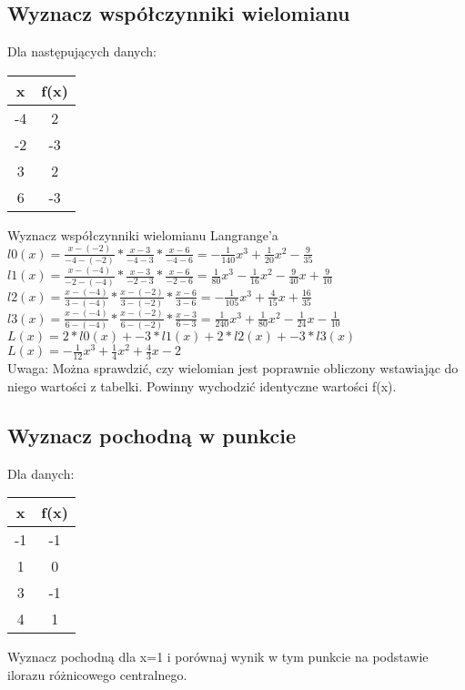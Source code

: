 \documentclass{article}
\begin{document}
\subsection{Wyznacz współczynniki wielomianu}
Dla następujących danych:
\begin{table}[H]
\begin{tabular}{|c|c|}
\hline
x  & f(x) \\ \hline
-4 & 2    \\ \hline
-2 & -3   \\ \hline
3  & 2    \\ \hline
6  & -3   \\ \hline
\end{tabular}
\end{table}
Wyznacz współczynniki wielomianu Langrange'a\\
$l0(x)=\frac{x- (-2)}{-4- (-2)}*\frac{x-3}{-4-3}*\frac{x-6}{-4-6} = -\frac{1}{140}x^3+\frac{1}{20}x^2-\frac{9}{35}$\\ %
$l1(x)=\frac{x- (-4)}{-2- (-4)}*\frac{x-3}{-2-3}*\frac{x-6}{-2-6} = \frac{1}{80}x^3-\frac{1}{16}x^2-\frac{9}{40}x+\frac{9}{10}$\\ %
$l2(x)=\frac{x- (-4)}{3- (-4)}*\frac{x- (-2)}{3- (-2)}*\frac{x-6}{3-6} = -\frac{1}{105}x^3+\frac{4}{15}x+\frac{16}{35}$\\ %
$l3(x)=\frac{x- (-4)}{6- (-4)}*\frac{x- (-2)}{6- (-2)}*\frac{x-3}{6-3} = \frac{1}{240}x^3+\frac{1}{80}x^2-\frac{1}{24}x-\frac{1}{10}$\\ %
$L(x)=2*l0(x)+-3*l1(x)+2*l2(x)+-3*l3(x)$\\
$L(x)=-\frac{1}{12}x^3+\frac{1}{4}x^2+\frac{4}{3}x-2$\\
Uwaga: Można sprawdzić, czy wielomian jest poprawnie obliczony wstawiając do niego wartości z tabelki. Powinny wychodzić identyczne wartości f(x).
\subsection{Wyznacz pochodną w punkcie}
Dla danych:
\begin{table}[H]
\begin{tabular}{|c|c|}
\hline
x  & f(x) \\ \hline
-1 & -1   \\ \hline
1  & 0    \\ \hline
3  & -1   \\ \hline
4  & 1    \\ \hline
\end{tabular}
\end{table}
Wyznacz pochodną dla x=1 i porównaj wynik w tym punkcie na podstawie ilorazu różnicowego centralnego.\\
\end{document}
